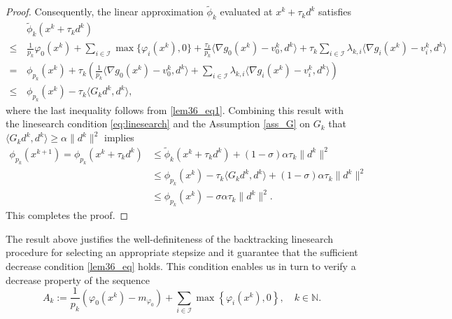 \documentclass[11pt,a4paper]{article}
\theoremstyle{plain}
\begin{document}
\begin{proof}
Consequently, the linear approximation $\tilde{\phi}_k$ evaluated at $x^k + \tau_k d^k$ satisfies
\begin{equation}\label{lem36_eq2}
    \begin{aligned}
        &\tilde{\phi}_k(x^k+\tau_kd^k)\\
        \leq \, & \frac{1}{p_k}\varphi_0(x^k) + \sum_{i \in \mathcal{I}} \max\{\varphi_i(x^k), 0\} + \frac{\tau_k}{p_k} \langle \nabla g_0(x^k) - v_0^k, d^k \rangle + \tau_k\sum_{i \in \mathcal{I}} \lambda_{k,i} \langle \nabla g_i(x^k) - v_i^k, d^k \rangle \\
        = \, & \phi_{p_k}(x^k) + \tau_k \left( \frac{1}{p_k} \langle \nabla g_0(x^k) - v_0^k, d^k \rangle + \sum_{i \in \mathcal{I}} \lambda_{k,i} \langle \nabla g_i(x^k) - v_i^k, d^k \rangle \right) \\
        \leq \, & \phi_{p_k}(x^k) - \tau_k\langle G_kd^k, d^k\rangle,
    \end{aligned}
\end{equation}
where the last inequality follows from \eqref{lem36_eq1}. Combining this result with the linesearch condition \eqref{eq:linesearch} and the Assumption \ref{ass_G} on $G_k$ that $\langle G_kd^k, d^k\rangle \geq \alpha\|d^k\|^2$ implies
\begin{equation*}
    \begin{aligned}
        \phi_{p_k}(x^{k+1}) = \phi_{p_k}(x^k+\tau_kd^k) &\leq \tilde{\phi}_k(x^k+\tau_kd^k) + (1-\sigma)\alpha\tau_k\|d^k\|^2 \\
        &\leq \phi_{p_k}(x^k) - \tau_k\langle G_kd^k, d^k\rangle + (1-\sigma)\alpha\tau_k\|d^k\|^2 \\
        &\leq \phi_{p_k}(x^k) - \sigma\alpha\tau_k\|d^k\|^2.
    \end{aligned}
\end{equation*}
This completes the proof.
\end{proof}

The result above justifies the well-definiteness of the backtracking linesearch procedure for selecting an appropriate stepsize and it guarantee that the sufficient decrease condition \eqref{lem36_eq} holds. This condition enables us in turn to verify a decrease property of the sequence
$$
A_k:=\frac{1}{p_k} \left( \varphi_0(x^k) - m_{\varphi_0} \right) +\sum_{i\in\mathcal I} \max \left\{ \varphi_i(x^k), 0 \right\},\quad k\in\mathbb{N}.
$$
\end{document}
